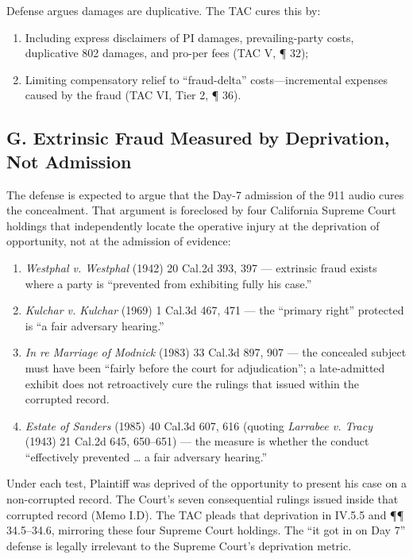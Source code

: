 Defense argues damages are duplicative. The TAC cures this by:

\begin{enumerate}
\def\labelenumi{\arabic{enumi}.}
\tightlist
\item
  Including express disclaimers of PI damages, prevailing-party costs, duplicative 802 damages, and pro-per fees (TAC \textsection{}V, ¶ 32);
\item
  Limiting compensatory relief to ``fraud-delta'' costs---incremental expenses caused by the fraud (TAC \textsection{}VI, Tier 2, ¶ 36).
\end{enumerate}

\subsection{G. Extrinsic Fraud Measured by Deprivation, Not Admission}\label{g.-extrinsic-fraud-measured-by-deprivation-not-admission}

The defense is expected to argue that the Day-7 admission of the 911 audio cures the concealment. That argument is foreclosed by four California Supreme Court holdings that independently locate the operative injury at the deprivation of opportunity, not at the admission of evidence:

\begin{enumerate}
\def\labelenumi{\arabic{enumi}.}
\tightlist
\item
  \emph{Westphal v. Westphal} (1942) 20 Cal.2d 393, 397 --- extrinsic fraud exists where a party is ``prevented from exhibiting fully his case.''
\item
  \emph{Kulchar v. Kulchar} (1969) 1 Cal.3d 467, 471 --- the ``primary right'' protected is ``a fair adversary hearing.''
\item
  \emph{In re Marriage of Modnick} (1983) 33 Cal.3d 897, 907 --- the concealed subject must have been ``fairly before the court for adjudication''; a late-admitted exhibit does not retroactively cure the rulings that issued within the corrupted record.
\item
  \emph{Estate of Sanders} (1985) 40 Cal.3d 607, 616 (quoting \emph{Larrabee v. Tracy} (1943) 21 Cal.2d 645, 650--651) --- the measure is whether the conduct ``effectively prevented \ldots{} a fair adversary hearing.''
\end{enumerate}

Under each test, Plaintiff was deprived of the opportunity to present his case on a non-corrupted record. The Court's seven consequential rulings issued inside that corrupted record (Memo \textsection{} I.D). The TAC pleads that deprivation in \textsection{}IV.5.5 and ¶¶ 34.5--34.6, mirroring these four Supreme Court holdings. The ``it got in on Day 7'' defense is legally irrelevant to the Supreme Court's deprivation metric.

